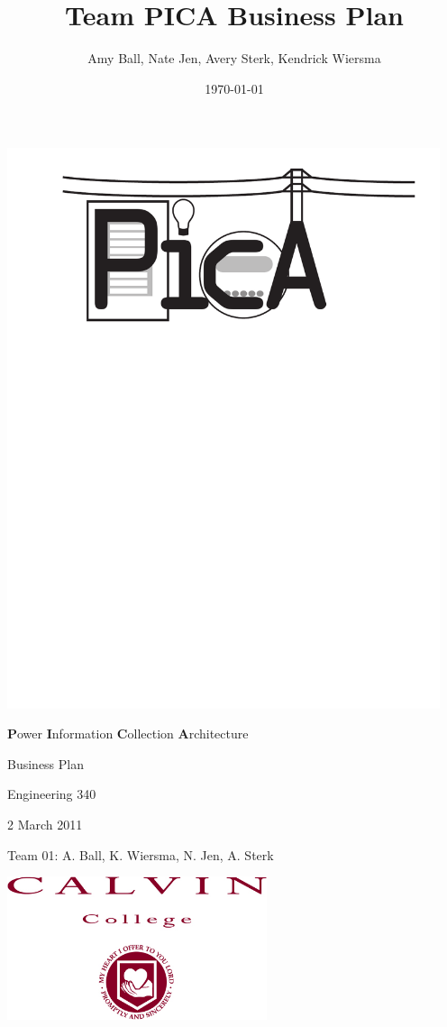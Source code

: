 \documentclass[11pt,letterpaper,titlepage]{article}
\title{Team PICA Business Plan}
\date{\today}
\author{Amy Ball, Nate Jen, Avery Sterk, Kendrick Wiersma}
\begin{document}
\begin{titlepage}
\begin{center}
\includegraphics[width=5in]{figures/TeamPicaLogo}

{\LARGE \textbf{P}ower \textbf{I}nformation \textbf{C}ollection \textbf{A}rchitecture}

\vspace{0.5in}

{\LARGE Business Plan}
\vspace{1in}

{\Large Engineering 340}

{\Large 2 March 2011}

{\Large Team 01: A. Ball, K. Wiersma, N. Jen, A. Sterk}

\vspace{1in}
\includegraphics[width=3in]{figures/Calvin_Logo}

\end{center}
\end{titlepage}
\end{document}
